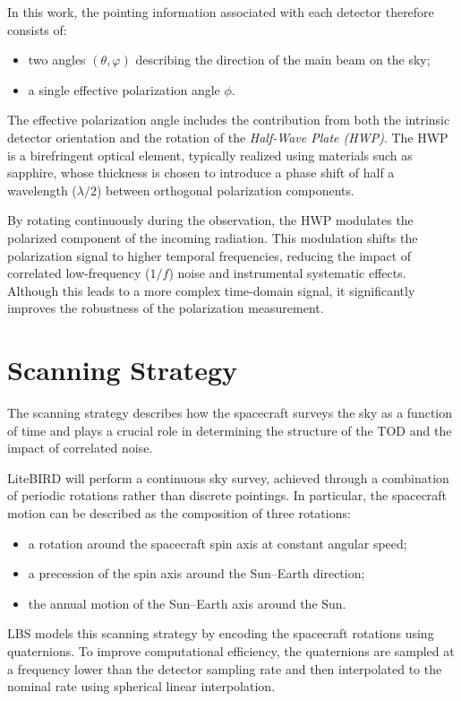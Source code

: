 In this work, the pointing information associated with each detector therefore consists of:
\begin{itemize}
    \item two angles $(\theta, \varphi)$ describing the direction of the main beam on the sky;
    \item a single effective polarization angle $\phi$.
\end{itemize}

The effective polarization angle includes the contribution from both the intrinsic detector orientation and the rotation of the \textit{Half-Wave Plate (HWP)}. The HWP is a birefringent optical element, typically realized using materials such as sapphire, whose thickness is chosen to introduce a phase shift of half a wavelength ($\lambda/2$) between orthogonal polarization components.

By rotating continuously during the observation, the HWP modulates the polarized component of the incoming radiation. This modulation shifts the polarization signal to higher temporal frequencies, reducing the impact of correlated low-frequency ($1/f$) noise and instrumental systematic effects. Although this leads to a more complex time-domain signal, it significantly improves the robustness of the polarization measurement.




\section{Scanning Strategy}

The scanning strategy describes how the spacecraft surveys the sky as a function of time and plays a crucial role in determining the structure of the TOD and the impact of correlated noise.

LiteBIRD will perform a continuous sky survey, achieved through a combination of periodic rotations rather than discrete pointings. In particular, the spacecraft motion can be described as the composition of three rotations:
\begin{itemize}
    \item a rotation around the spacecraft spin axis at constant angular speed;
    \item a precession of the spin axis around the Sun–Earth direction;
    \item the annual motion of the Sun–Earth axis around the Sun.
\end{itemize}

LBS models this scanning strategy by encoding the spacecraft rotations using quaternions. To improve computational efficiency, the quaternions are sampled at a frequency lower than the detector sampling rate and then interpolated to the nominal rate using spherical linear interpolation.

